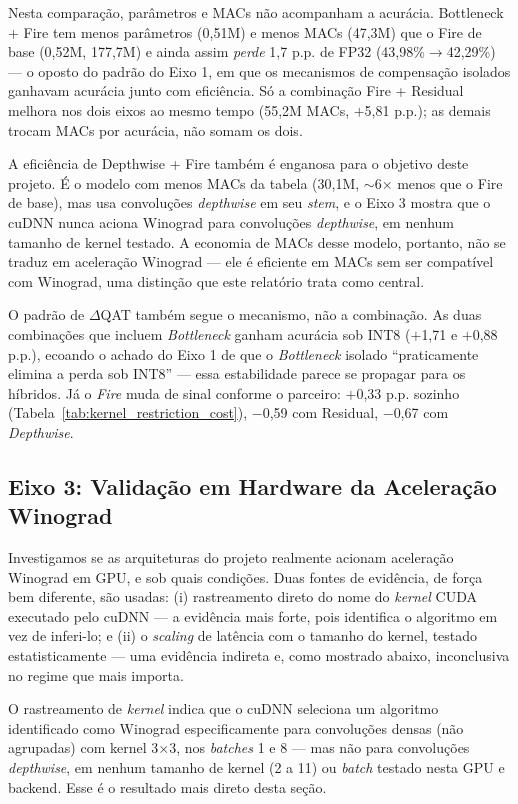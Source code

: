 \documentclass[conference]{IEEEtran}
\begin{document}
Nesta comparação, parâmetros e MACs não acompanham a acurácia. Bottleneck + Fire tem
menos parâmetros (0,51M) e menos MACs (47,3M) que o Fire de base (0,52M, 177,7M) e ainda assim
\emph{perde} 1,7 p.p. de FP32 (43,98\%$\to$42,29\%) — o oposto do padrão do Eixo 1, em que os
mecanismos de compensação isolados ganhavam acurácia junto com eficiência. Só a combinação
Fire + Residual melhora nos dois eixos ao mesmo tempo (55,2M MACs, $+$5,81 p.p.); as demais trocam
MACs por acurácia, não somam os dois.

A eficiência de Depthwise + Fire também é enganosa para o objetivo deste
projeto. É o modelo com menos MACs da tabela (30,1M, $\sim$6$\times$ menos que o Fire de base),
mas usa convoluções \textit{depthwise} em seu \textit{stem}, e o Eixo 3
mostra que o cuDNN nunca aciona Winograd para convoluções \textit{depthwise}, em nenhum tamanho de
kernel testado. A economia de MACs desse modelo, portanto, não se traduz em aceleração Winograd —
ele é eficiente em MACs sem ser compatível com Winograd, uma distinção que este relatório trata
como central.

O padrão de $\Delta$QAT também segue o mecanismo, não a combinação. As duas combinações que
incluem \textit{Bottleneck} ganham acurácia sob INT8 ($+$1,71 e $+$0,88 p.p.), ecoando o achado do
Eixo 1 de que o \textit{Bottleneck} isolado ``praticamente elimina a perda sob INT8'' — essa
estabilidade parece se propagar para os híbridos. Já o \textit{Fire} muda de sinal conforme o
parceiro: $+$0,33 p.p. sozinho (Tabela~\ref{tab:kernel_restriction_cost}), $-$0,59 com Residual,
$-$0,67 com \textit{Depthwise}.

\subsection{Eixo 3: Validação em Hardware da Aceleração Winograd}

Investigamos se as arquiteturas do projeto realmente acionam aceleração Winograd em GPU, e sob
quais condições. Duas fontes de evidência, de força bem diferente, são usadas: (i) rastreamento
direto do nome do \textit{kernel} CUDA executado pelo cuDNN — a evidência mais forte, pois
identifica o algoritmo em vez de inferi-lo; e (ii) o \textit{scaling} de latência com o tamanho do
kernel, testado estatisticamente — uma evidência indireta e, como mostrado abaixo, inconclusiva no
regime que mais importa.

O rastreamento de \textit{kernel} indica que o cuDNN seleciona um algoritmo identificado como
Winograd especificamente para convoluções densas (não agrupadas) com kernel 3$\times$3, nos
\textit{batches} 1 e 8 — mas não para convoluções \textit{depthwise}, em nenhum tamanho de kernel
(2 a 11) ou \textit{batch} testado nesta GPU e backend. Esse é o resultado mais direto desta seção.
\end{document}
